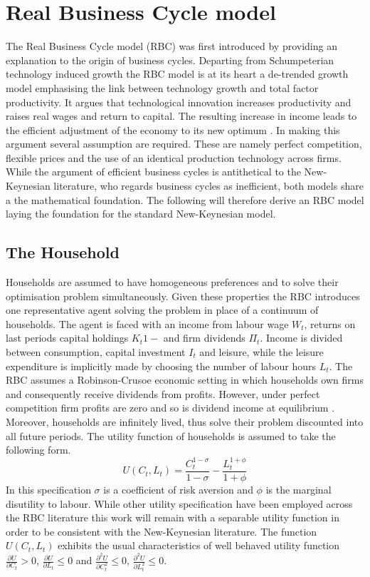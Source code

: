 \documentclass[12pt,a4paper,english]{article} %
\let\oldsection\section
\renewcommand\section{\clearpage\oldsection}
\begin{document}
	\section{Real Business Cycle model}
	The Real Business Cycle model (RBC) was first introduced by \cite{prescott_theory_1986} providing an explanation to the origin of business cycles. Departing from Schumpeterian technology induced growth the RBC model is at its heart a de-trended growth model emphasising the link between technology growth and total factor productivity. It argues that technological innovation increases productivity and raises real wages and return to capital. The resulting increase in income leads to the efficient adjustment of the economy to its new optimum \cite{prescott_theory_1986}. 
	In making this argument several assumption are required. These are namely perfect competition, flexible prices and the use of an identical production technology across firms. 
	While the argument of efficient business cycles is antithetical to the New-Keynesian literature, who regards business cycles as inefficient, both models share a the mathematical foundation. The following will therefore derive an RBC model laying the foundation for the standard New-Keynesian model.
	
	\subsection{The Household}
	Households are assumed to have homogeneous preferences and to solve their optimisation problem simultaneously. Given these properties the RBC introduces one representative agent solving the problem in place of a continuum of households.
	The agent is faced with an income from labour wage $W_t$, returns on last periods capital holdings $K_t{1-}$ and firm dividends $\Pi_t$. Income is divided between consumption, capital investment $I_t$ and leisure, while the leisure expenditure is implicitly made by choosing the number of labour hours $L_t$. The RBC assumes a Robinson-Crusoe economic setting in which households own firms and consequently receive dividends from profits. However, under perfect competition firm profits are zero and so is dividend income at equilibrium \cite{prescott_theory_1986}. 
	Moreover, households are infinitely lived, thus solve their problem discounted into all future periods. The utility function of households is assumed to take the following form.
	\begin{equation}
		U(C_t, L_t) = \frac{C_t^{1-\sigma}}{{1-\sigma}} - \frac{L_t^{1+\phi}}{1+\phi} 
	\end{equation}
	In this specification $\sigma$ is a coefficient of risk aversion and $\phi$ is the marginal disutility to labour. While other utility specification have been employed across the RBC literature this work will remain with a separable utility function in order to be consistent with the New-Keynesian literature. The function $U(C_t, L_t)$ exhibits the usual characteristics of well behaved utility function $\frac{\partial U}{\partial C_t} > 0$, $\frac{\partial U}{\partial L_t} \leq 0$ and $\frac{\partial^2 U}{\partial C_t^2} \leq 0$, $\frac{\partial^2 U}{\partial L_t^2} \leq 0$.
	
\end{document}
